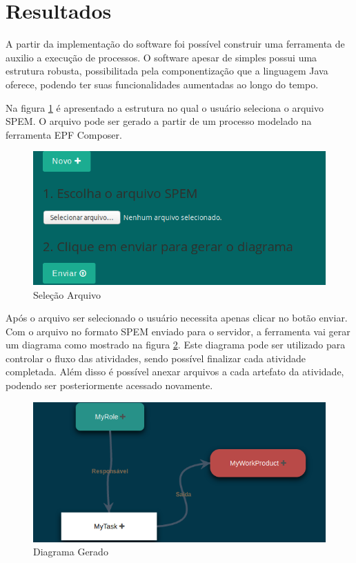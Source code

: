 \section{Resultados}\label{resultados}
A partir da implementação do software foi possível construir uma ferramenta de auxilio a execução de processos. O software apesar de simples possui uma estrutura robusta, possibilitada pela componentização que a linguagem Java oferece, podendo ter suas funcionalidades aumentadas ao longo do tempo.

Na figura \ref{figura:selecaoarquivo} é apresentado a estrutura no qual o usuário seleciona o arquivo SPEM. O arquivo pode ser gerado a partir de um processo modelado na ferramenta EPF Composer.
\begin{figure}[!htb]
	\caption{Seleção Arquivo}
	\label{figura:selecaoarquivo}
	\begin{center}
		\includegraphics[scale=0.4]{img/ferramenta_selecao_arquivo}
	\end{center}
\end{figure}

Após o arquivo ser selecionado o usuário necessita apenas clicar no botão enviar. Com o arquivo no formato SPEM enviado para o servidor, a ferramenta vai gerar um diagrama como mostrado na figura \ref{figura:diagramagerado}. Este diagrama pode ser utilizado para controlar o fluxo das atividades, sendo possível finalizar cada atividade completada. Além disso é possível anexar arquivos a cada artefato da atividade, podendo ser posteriormente acessado novamente.

\begin{figure}[!htb]
	\caption{Diagrama Gerado}\label{figura:diagramagerado}
	\begin{center}
		\includegraphics[scale=0.4]{img/ferramenta_diagrama_gerado}
	\end{center}
\end{figure}

